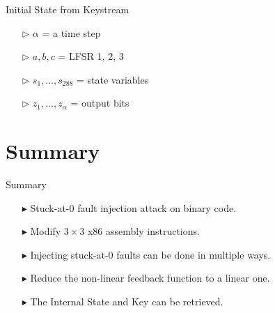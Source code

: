 \documentclass[conference]{IEEEtran}
\begin{document}
Initial State from Keystream

\begin{itemize}
\item[$\triangleright$] $\alpha$ = a time step
\item[$\triangleright$] $a, b, c$ = LFSR 1, 2, 3
\item[$\triangleright$] $s_1,\dots,s_{288}$ = state variables
\item[$\triangleright$] $z_1,\dots,z_{\alpha}$ = output bits
\end{itemize}

\section{Summary}

Summary
\begin{itemize}[itemsep=0.5cm]
\item[$\blacktriangleright$] Stuck-at-0 fault injection attack on binary code.
\item[$\blacktriangleright$] Modify $3 \times 3$ x86 assembly instructions.
\item[$\blacktriangleright$] Injecting stuck-at-0 faults can be done in multiple ways.
\item[$\blacktriangleright$] Reduce the non-linear feedback function to a linear one.
\item[$\blacktriangleright$] The Internal State and Key can be retrieved. 
\end{itemize}
\end{document}

